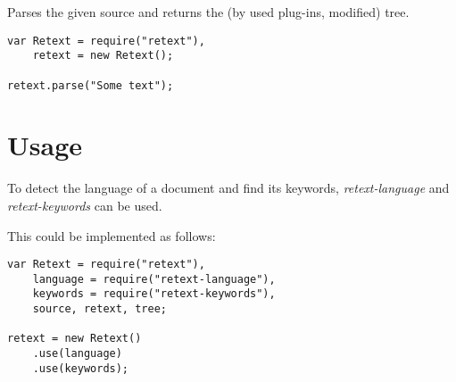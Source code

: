 Parses the given source and returns the (by used plug-ins, modified) tree.

\begin{lstlisting}
var Retext = require("retext"),
    retext = new Retext();

retext.parse("Some text");
\end{lstlisting}

\section*{Usage}

To detect the language of a document and find its keywords,
  \emph{retext-language} and \emph{retext-keywords} can be used.

This could be implemented as follows:

\begin{lstlisting}
var Retext = require("retext"),
    language = require("retext-language"),
    keywords = require("retext-keywords"),
    source, retext, tree;

retext = new Retext()
    .use(language)
    .use(keywords);


\end{lstlisting}
